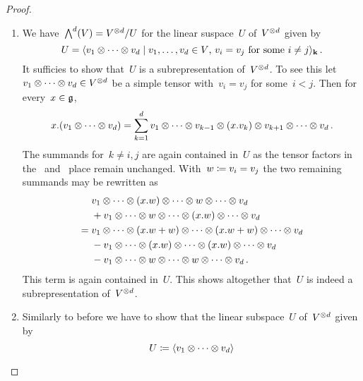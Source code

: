 \begin{proof}
  \leavevmode
  \begin{enumerate}
    \item
      We have~$\bigwedge^d(V) = V^{\otimes d}/U$ for the linear suspace~$U$ of~$V^{\otimes d}$ given by
      \[
        U
        =
        \gen{
          v_1 \tensor \dotsb \tensor v_d
        \suchthat
          \text{$v_1, \dotsc, v_d \in V$,~$v_i = v_j$ for some~$i \neq j$}
        }_{\kf} \,.
      \]
      It sufficies to show that~$U$ is a subrepresentation of~$V^{\otimes d}$.
      To see this let~$v_1 \otimes \dotsb \otimes v_d \in V^{\otimes d}$ be a simple tensor with~$v_i = v_j$ for some~$i < j$.
      Then for every~$x \in \mathfrak{g}$,
      \[
        x.(v_1 \otimes \dotsb \otimes v_d)
        =
        \sum_{k=1}^d v_1
        \otimes \dotsb \otimes v_{k-1}
        \otimes (x.v_k)
        \otimes v_{k+1} \otimes \dotsb \otimes v_d  \,.
      \]
      The summands for~$k \neq i,j$ are again contained in~$U$ as the tensor factors in the~{} and~{} place remain unchanged.
      With~$w \coloneqq v_i = v_j$ the two remaining summands may be rewritten as
      \begin{align*}
        {}&
          v_1 \otimes \dotsb
          \otimes (x.w)
          \otimes \dotsb
          \otimes w
          \otimes \dotsb \otimes v_d
        \\
        {}&
        + v_1 \otimes \dotsb
          \otimes w
          \otimes \dotsb
          \otimes (x.w)
          \otimes \dotsb \otimes v_d
        \\
        ={}&
          v_1 \otimes \dotsb
          \otimes (x.w + w)
          \otimes \dotsb
          \otimes (x.w + w)
          \otimes \dotsb \otimes v_d
        \\
        {}&
        - v_1 \otimes \dotsb
          \otimes (x.w)
          \otimes \dotsb
          \otimes (x.w)
          \otimes \dotsb \otimes v_d
        \\
        {}&
        - v_1 \otimes \dotsb
          \otimes w
          \otimes \dotsb
          \otimes w
          \otimes \dotsb \otimes v_d  \,.
      \end{align*}
      This term is again contained in~$U$.
      This shows altogether that~$U$ is indeed a subrepresentation of~$V^{\otimes d}$.
    \item
      Similarly to before we have to show that the linear subspace~$U$ of~$V^{\otimes d}$ given by
      \[
        U
        \coloneqq
        \langle
          v_1 \otimes \dotsb \otimes v_d
\rangle\]
\end{enumerate}
\end{proof}
